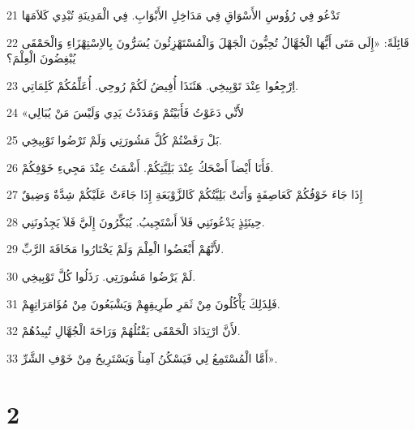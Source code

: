 \par 21 تَدْعُو فِي رُؤُوسِ الأَسْوَاقِ فِي مَدَاخِلِ الأَبْوَابِ. فِي الْمَدِينَةِ تُبْدِي كَلاَمَهَا
\par 22 قَائِلَةً: «إِلَى مَتَى أَيُّهَا الْجُهَّالُ تُحِبُّونَ الْجَهْلَ وَالْمُسْتَهْزِئُونَ يُسَرُّونَ بِالاِسْتِهْزَاءِ وَالْحَمْقَى يُبْغِضُونَ الْعِلْمَ؟
\par 23 اِرْجِعُوا عِنْدَ تَوْبِيخِي. هَئَنَذَا أُفِيضُ لَكُمْ رُوحِي. أُعَلِّمُكُمْ كَلِمَاتِي.
\par 24 «لأَنِّي دَعَوْتُ فَأَبَيْتُمْ وَمَدَدْتُ يَدِي وَلَيْسَ مَنْ يُبَالِي
\par 25 بَلْ رَفَضْتُمْ كُلَّ مَشُورَتِي وَلَمْ تَرْضُوا تَوْبِيخِي.
\par 26 فَأَنَا أَيْضاً أَضْحَكُ عِنْدَ بَلِيَّتِكُمْ. أَشْمَتُ عِنْدَ مَجِيءِ خَوْفِكُمْ.
\par 27 إِذَا جَاءَ خَوْفُكُمْ كَعَاصِفَةٍ وَأَتَتْ بَلِيَّتُكُمْ كَالزَّوْبَعَةِ إِذَا جَاءَتْ عَلَيْكُمْ شِدَّةٌ وَضِيقٌ
\par 28 حِينَئِذٍ يَدْعُونَنِي فَلاَ أَسْتَجِيبُ. يُبَكِّرُونَ إِلَيَّ فَلاَ يَجِدُونَنِي.
\par 29 لأَنَّهُمْ أَبْغَضُوا الْعِلْمَ وَلَمْ يَخْتَارُوا مَخَافَةَ الرَّبِّ.
\par 30 لَمْ يَرْضُوا مَشُورَتِي. رَذَلُوا كُلَّ تَوْبِيخِي.
\par 31 فَلِذَلِكَ يَأْكُلُونَ مِنْ ثَمَرِ طَرِيقِهِمْ وَيَشْبَعُونَ مِنْ مُؤَامَرَاتِهِمْ.
\par 32 لأَنَّ ارْتِدَادَ الْحَمْقَى يَقْتُلُهُمْ وَرَاحَةَ الْجُهَّالِ تُبِيدُهُمْ.
\par 33 أَمَّا الْمُسْتَمِعُ لِي فَيَسْكُنُ آمِناً وَيَسْتَرِيحُ مِنْ خَوْفِ الشَّرِّ».

\chapter{2}

